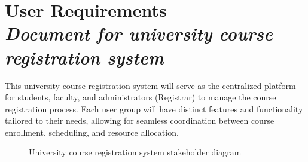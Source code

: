 \chapter{User Requirements \\
\small{\textit{Document for university course registration system}}
\label{Chapter::UserRequirements}}
\small
This university course registration system will serve as the centralized platform for students, faculty, and administrators (Registrar) to manage the \gls{course} registration process. Each user group will have distinct features and functionality tailored to their needs, allowing for seamless coordination between course \gls{enrollment}, scheduling, and resource allocation.

\begin{figure}[h]
    \centering
    \caption{ University course registration system stakeholder diagram}
\end{figure}

